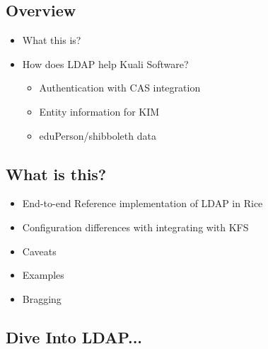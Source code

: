 \documentclass[12pt,notitlepage]{article}
\author{Leo Przybylski}
\begin{document}
  \W \begin{s5presentation}
  \maketitle

%
%
  \W \begin{s5slide}
    \section{Overview}

    \begin{itemize}
      \item What this is?
      \item How does LDAP help Kuali Software?
        \begin{itemize}
          \item Authentication with CAS integration
          \item Entity information for KIM
          \item eduPerson/shibboleth data
        \end{itemize}
    \end{itemize}
  \W \end{s5slide}


%
%
  \W \begin{s5slide}
    \section{What is this?}

    \begin{itemize}
      \item End-to-end Reference implementation of LDAP in Rice
      \item Configuration differences with integrating with KFS
      \item Caveats
      \item Examples
      \item Bragging
      \end{itemize}
    \W \end{s5slide}
 
%
%
  \W \begin{s5slide}
    \section{Dive Into LDAP...}


\end{s5slide}
\end{s5presentation}
\end{document}
